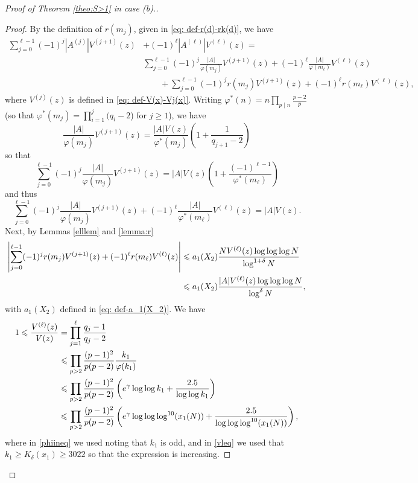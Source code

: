 \documentclass[12pt]{amsart}
\begin{document}
\begin{proof}[Proof of Theorem \ref{theo:S>1} in case (b).]
\begin{proof}
By the definition of $r(m_j)$, given in \eqref{eq: def-r(d)-rk(d)}, we have
\begin{align*}
    \sum_{j=0}^{\ell-1}(-1)^j|A^{(j)}|V^{(j+1)}(z)&+(-1)^{\ell}|A^{(\ell)}|V^{(\ell)}(z)=\\
    &\sum_{j=0}^{\ell-1}(-1)^j\frac{|A|}{\varphi(m_j)}V^{(j+1)}(z)+(-1)^{\ell}\frac{|A|}{\varphi(m_\ell)}V^{(\ell)}(z)\\
    &\qquad+\sum_{j=0}^{\ell-1}(-1)^jr(m_j)V^{(j+1)}(z)+(-1)^{\ell}r(m_\ell)V^{(\ell)}(z),
\end{align*}
where $V^{(j)}(z)$ is defined in \eqref{eq: def-V(x)-Vj(x)}.
Writing \label{def-varphi-*-n} $\varphi^*(n)=n\prod_{p\mid n}\frac{p-2}{p}$ (so that $\varphi^*(m_j)=\prod_{i=1}^j(q_i-2$) for $j\ge 1$), we have
\begin{equation*}
    \frac{|A|}{\varphi(m_j)}V^{(j+1)}(z)=\frac{|A|V(z)}{\varphi^*(m_j)}\left(1+\frac{1}{q_{j+1}-2}\right)
\end{equation*}
so that
\begin{equation}\label{firstlinephieq}
    \sum_{j=0}^{\ell-1}(-1)^j\frac{|A|}{\varphi(m_j)}V^{(j+1)}(z)=|A|V(z)\left(1+\frac{(-1)^{\ell-1}}{\varphi^*(m_\ell)}\right)
\end{equation}
and thus
\begin{equation*}
    \sum_{j=0}^{\ell-1}(-1)^j\frac{|A|}{\varphi(m_j)}V^{(j+1)}(z)+(-1)^{\ell}\frac{|A|}{\varphi^*(m_{\ell})}V^{(\ell)}(z)=|A|V(z).
\end{equation*}
Next, by Lemmas \ref{elllem} and \ref{lemma:r}
\begin{align}
    \left|\sum_{j=0}^{\ell-1}(-1)^jr(m_j)V^{(j+1)}(z)+(-1)^{\ell}r(m_\ell)V^{(\ell)}(z)\right|&\le a_1(X_2)\frac{NV^{(\ell)}(z)\log\log\log N}{\log^{1+\delta}N}\notag\\
    &\le a_1(X_2)\frac{|A|V^{(\ell)}(z)\log\log\log N}{\log^{\delta}N}\label{a1eq},
\end{align}
with $a_1(X_2)$ defined in \eqref{eq: def-a_1(X_2)}. We have
\begin{align}
    1 \le \frac{V^{(\ell)}(z)}{V(z)}&=\prod_{j=1}^\ell\frac{q_j-1}{q_j-2}\notag\\
    &\le\prod_{p>2}\frac{(p-1)^2}{p(p-2)}\frac{k_1}{\varphi(k_1)}\notag\\
    &\le\prod_{p>2}\frac{(p-1)^2}{p(p-2)}\left(e^{\gamma}\log\log k_1+\frac{2.5}{\log\log k_1}\right)\label{phiineq}\\
    &\le\prod_{p>2}\frac{(p-1)^2}{p(p-2)}\left(e^{\gamma}\log\log\log^{10}(x_1(N))+\frac{2.5}{\log\log\log^{10}(x_1(N))}\right),\label{vleq} 
\end{align}
where in \eqref{phiineq} we used \cite[Theorem 15]{R-S} noting that $k_1$ is odd, and in \eqref{vleq} we used that $k_1\ge K_{\delta}(x_1)\ge 3022$ so that the expression is increasing. 


\end{proof}
\end{proof}
\end{document}
